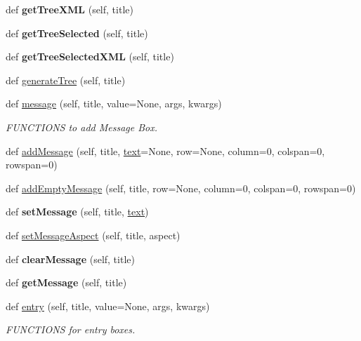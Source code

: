 \begin{DoxyCompactItemize}
def {\bfseries get\+Tree\+X\+ML} (self, title)
\item 
\mbox{\label{classappjar_1_1gui_adc5ce3bdee1b99edbd98fe83d95d0c55}} 
def {\bfseries get\+Tree\+Selected} (self, title)
\item 
\mbox{\label{classappjar_1_1gui_a5ec1caf2069199ddc1adb6663483b049}} 
def {\bfseries get\+Tree\+Selected\+X\+ML} (self, title)
\item 
def \hyperlink{classappjar_1_1gui_af9ca9cbf56054fda8f983fca10c41928}{generate\+Tree} (self, title)
\item 
def \hyperlink{classappjar_1_1gui_ad6a86c8206b7949e6726fdc8543d1957}{message} (self, title, value=None, args, kwargs)
\begin{DoxyCompactList}\small\item\em F\+U\+N\+C\+T\+I\+O\+NS to add Message Box. \end{DoxyCompactList}\item 
def \hyperlink{classappjar_1_1gui_a0aab530d16cb1f1affd1fa70da523637}{add\+Message} (self, title, \hyperlink{classappjar_1_1gui_a221b516425bf76dd8560ec9f4818182f}{text}=None, row=None, column=0, colspan=0, rowspan=0)
\item 
def \hyperlink{classappjar_1_1gui_a706bcec42d6e462a40f8360fcd7130a2}{add\+Empty\+Message} (self, title, row=None, column=0, colspan=0, rowspan=0)
\item 
\mbox{\label{classappjar_1_1gui_a030d818881dc018f302d52f1fba60f45}} 
def {\bfseries set\+Message} (self, title, \hyperlink{classappjar_1_1gui_a221b516425bf76dd8560ec9f4818182f}{text})
\item 
def \hyperlink{classappjar_1_1gui_a6847f01b0c4922f9941e81d0317a313a}{set\+Message\+Aspect} (self, title, aspect)
\item 
\mbox{\label{classappjar_1_1gui_afaa75b6ef3774b72fcf6dbaefcd4236b}} 
def {\bfseries clear\+Message} (self, title)
\item 
\mbox{\label{classappjar_1_1gui_ae4ebad4a21a0ee3d2d7f9eb6fb7fd02f}} 
def {\bfseries get\+Message} (self, title)
\item 
def \hyperlink{classappjar_1_1gui_af671c577cd0dd722c41481db20ff80f5}{entry} (self, title, value=None, args, kwargs)
\begin{DoxyCompactList}\small\item\em F\+U\+N\+C\+T\+I\+O\+NS for entry boxes. \end{DoxyCompactList}\item 

\end{DoxyCompactItemize}
